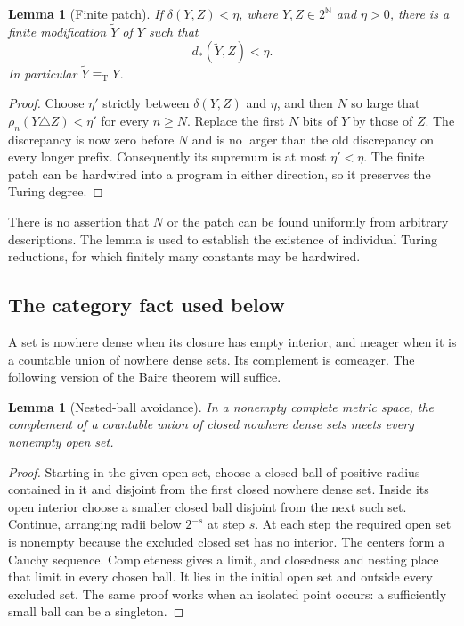 \documentclass[11pt,a4paper]{article}
\newcommand{\N}{\mathbb N}
\newcommand{\Cantor}{2^{\N}}
\newcommand{\eqT}{\equiv_{\mathrm T}}
\newcommand{\dst}{d_{\!*}}
\newtheorem{lemma}[theorem]{Lemma}
\theoremstyle{definition}\newtheorem{definition}[theorem]{Definition}
\theoremstyle{remark}\newtheorem{remark}[theorem]{Remark}
\begin{document}
\begin{lemma}[Finite patch]\label{lem:patch}
If $\delta(Y,Z)<\eta$, where $Y,Z\in\Cantor$ and $\eta>0$, there is a finite modification $\widetilde Y$ of $Y$ such that
\[
                     \dst(\widetilde Y,Z)<\eta.
\]
In particular $\widetilde Y\eqT Y$.
\end{lemma}
\begin{proof}
Choose $\eta'$ strictly between $\delta(Y,Z)$ and $\eta$, and then $N$ so large that $\rho_n(Y\triangle Z)<\eta'$ for every $n\ge N$. Replace the first $N$ bits of $Y$ by those of $Z$. The discrepancy is now zero before $N$ and is no larger than the old discrepancy on every longer prefix. Consequently its supremum is at most $\eta'<\eta$. The finite patch can be hardwired into a program in either direction, so it preserves the Turing degree.
\end{proof}

There is no assertion that $N$ or the patch can be found uniformly from arbitrary descriptions. The lemma is used to establish the existence of individual Turing reductions, for which finitely many constants may be hardwired.

\subsection{The category fact used below}
A set is nowhere dense when its closure has empty interior, and meager when it is a countable union of nowhere dense sets. Its complement is comeager. The following version of the Baire theorem will suffice.

\begin{lemma}[Nested-ball avoidance]\label{lem:baire}
In a nonempty complete metric space, the complement of a countable union of closed nowhere dense sets meets every nonempty open set.
\end{lemma}
\begin{proof}
Starting in the given open set, choose a closed ball of positive radius contained in it and disjoint from the first closed nowhere dense set. Inside its open interior choose a smaller closed ball disjoint from the next such set. Continue, arranging radii below $2^{-s}$ at step $s$. At each step the required open set is nonempty because the excluded closed set has no interior. The centers form a Cauchy sequence. Completeness gives a limit, and closedness and nesting place that limit in every chosen ball. It lies in the initial open set and outside every excluded set. The same proof works when an isolated point occurs: a sufficiently small ball can be a singleton.
\end{proof}
\end{document}
